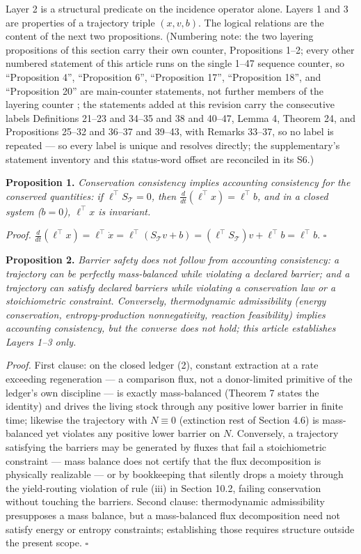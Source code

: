 \documentclass[11pt]{article}
\begin{document}
Layer 2 is a structural predicate on the incidence operator alone.
Layers 1 and 3 are properties of a trajectory triple \((x, v, b)\). The
logical relations are the content of the next two propositions.
(Numbering note: the two layering propositions of this section carry
their own counter, Propositions 1--2; every other numbered statement of
this article runs on the single 1--47 sequence counter, so ``Proposition
4'', ``Proposition 6'', ``Proposition 17'', ``Proposition 18'', and
``Proposition 20'' are main-counter statements, not further members of
the layering counter ; the statements added at this revision carry the consecutive labels Definitions 21--23 and 34--35 and 38 and 40--47, Lemma 4, Theorem 24, and Propositions 25--32 and 36--37 and 39--43, with Remarks 33--37, so no label is repeated --- so every label is unique and resolves directly;
the supplementary's statement inventory and this status-word offset are
reconciled in its S6.)

\textbf{Proposition 1.} \emph{Conservation consistency implies
accounting consistency for the conserved quantities: if
\(\ell^\top S_{\mathcal{T}} = 0\), then
\(\frac{d}{dt}(\ell^\top x) = \ell^\top b\), and in a closed system
(\(b = 0\)), \(\ell^\top x\) is invariant.}

\emph{Proof.}
\(\frac{d}{dt}(\ell^\top x) = \ell^\top \dot x = \ell^\top(S_{\mathcal{T}} v + b) = (\ell^\top S_{\mathcal{T}}) v + \ell^\top b = \ell^\top b\).
\ensuremath{\square}

\textbf{Proposition 2.} \emph{Barrier safety does not follow from
accounting consistency: a trajectory can be perfectly mass-balanced
while violating a declared barrier; and a trajectory can satisfy
declared barriers while violating a conservation law or a stoichiometric
constraint. Conversely, thermodynamic admissibility (energy
conservation, entropy-production nonnegativity, reaction feasibility)
implies accounting consistency, but the converse does not hold; this
article establishes Layers 1--3 only.}

\emph{Proof.} First clause: on the closed ledger (2), constant
extraction at a rate exceeding regeneration --- a comparison flux, not a
donor-limited primitive of the ledger's own discipline --- is exactly
mass-balanced (Theorem 7 states the identity) and drives the living
stock through any positive lower barrier in finite time; likewise the
trajectory with \(N \equiv 0\) (extinction rest of Section 4.6) is
mass-balanced yet violates any positive lower barrier on \(N\).
Conversely, a trajectory satisfying the barriers may be generated by
fluxes that fail a stoichiometric constraint --- mass balance does not
certify that the flux decomposition is physically realizable --- or by
bookkeeping that silently drops a moiety through the yield-routing
violation of rule (iii) in Section 10.2, failing conservation without
touching the barriers. Second clause: thermodynamic admissibility
presupposes a mass balance, but a mass-balanced flux decomposition need
not satisfy energy or entropy constraints; establishing those requires
structure outside the present scope. \ensuremath{\square}
\end{document}
